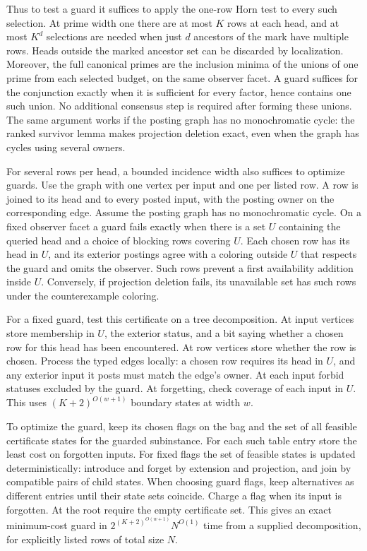Thus to test a guard it suffices to apply the
one-row Horn test to every such selection.
At prime width one there are at most $K$ rows
at each head, and at most $K^d$ selections are
needed when just $d$ ancestors of the mark have
multiple rows. Heads outside the marked ancestor
set can be discarded by localization. Moreover,
the full canonical primes are the inclusion
minima of the unions of one prime from each
selected budget, on the same observer facet.
A guard suffices for the conjunction exactly
when it is sufficient for every factor, hence
contains one such union. No additional consensus
step is required after forming these unions.
The same argument works if the posting graph has
no monochromatic cycle: the ranked survivor lemma
makes projection deletion exact, even when the
graph has cycles using several owners.

For several rows per head, a bounded incidence width
also suffices to optimize guards. Use the graph with
one vertex per input and one per listed row. A row
is joined to its head and to every posted input,
with the posting owner on the corresponding edge.
Assume the posting graph has no monochromatic cycle.
On a fixed observer facet a guard fails exactly when
there is a set $U$ containing the queried head and
a choice of blocking rows covering $U$. Each chosen
row has its head in $U$, and its exterior postings
agree with a coloring outside $U$ that respects the
guard and omits the observer. Such rows prevent a
first availability addition inside $U$. Conversely,
if projection deletion fails, its unavailable set
has such rows under the counterexample coloring.

For a fixed guard, test this certificate on a tree
decomposition. At input vertices store membership in
$U$, the exterior status, and a bit saying whether a
chosen row for this head has been encountered. At row
vertices store whether the row is chosen. Process
the typed edges locally: a chosen row requires its
head in $U$, and any exterior input it posts must
match the edge's owner. At each input forbid statuses
excluded by the guard. At forgetting, check coverage
of each input in $U$. This uses $(K+2)^{O(w+1)}$
boundary states at width $w$.

To optimize the guard, keep its chosen flags on the
bag and the set of all feasible certificate states
for the guarded subinstance. For each such table
entry store the least cost on forgotten inputs.
For fixed flags the set of feasible states is updated
deterministically: introduce and forget by extension
and projection, and join by compatible pairs of child
states. When choosing guard flags, keep alternatives
as different entries until their state sets coincide.
Charge a flag when its input is forgotten. At the
root require the empty certificate set. This gives
an exact minimum-cost guard in
$2^{(K+2)^{O(w+1)}}N^{O(1)}$ time from a supplied
decomposition, for explicitly listed rows of total
size $N$.

